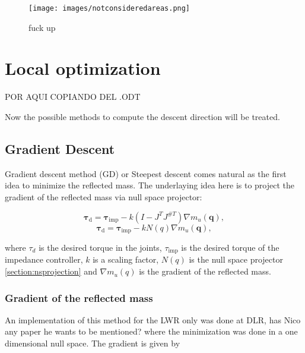 \begin{figure}[htb]
	\centerline{
		\texttt{[image: images/notconsideredareas.png]}}
	\caption{fuck up}
	\label{fig:notconsideredareas}
\end{figure}


\section{Local optimization}

{\color{red} POR AQUI COPIANDO DEL .ODT}

Now the possible methods to compute the descent direction will be treated.

\subsection{Gradient Descent}

Gradient descent method (GD) or Steepest descent comes natural as the first idea to minimize the reflected mass. The underlaying idea here is to project the gradient of the reflected mass via null space projector:

\begin{equation}
\mathbf{\tau_\mathrm{d}} = \mathbf{\tau_\mathrm{imp}} - k (I - J^T J^{\#T}) \nabla m_u(\mathbf{q}), \label{eq:gradient_controller}
\end{equation}\textsl{\textsl{\begin{equation}
\mathbf{\tau_\mathrm{d}} = \mathbf{\tau_\mathrm{imp}} - k N(q) \nabla m_u(\mathbf{q}), \label{eq:gradient_controller}
\end{equation}\textsl{}}}

where $\tau_d$ is the desired torque in the joints,
$\tau_\mathrm{imp}$ is the desired torque of the impedance controller,
$k$ is a scaling factor,
$ N(q)$ is the null space projector \ref{section:nsprojection}
and $\nabla m_u(q)$ is the gradient of the reflected mass.

\subsubsection{Gradient of the reflected mass}
An implementation of this method for the LWR only was done at DLR, {\color{red} has Nico any paper he wants to be mentioned?} where the minimization was done in a one dimensional null space. 
The gradient is given by



